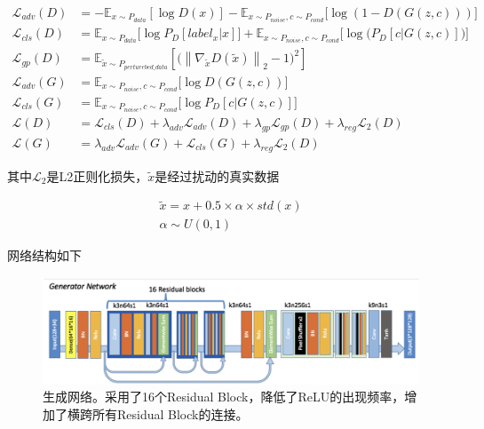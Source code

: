 \documentclass[a4paper,12pt,UTF8]{ctexart}
\newcommand{\norm}[1]{\left\lVert#1\right\rVert}
\newcommand{\kai}{\CJKfamily{zhkai}}	%
\begin{document}
\begin{equation}
\begin{aligned}
  \mathcal{L}_{adv}(D) &= -\mathbb{E}_{x\sim P_{data}}[\log D(x)] - \mathbb{E}_{x\sim P_{noise},c\sim P_{cond}}\big[\log(1-D(G(z,c)))\big] \\
  \mathcal{L}_{cls}(D) &= \mathbb{E}_{x\sim P_{data}}\big[\log P_D[label_x|x]\big] + \mathbb{E}_{x\sim P_{noise},c\sim P_{cond}}\Big[\log\big(P_D[c|G(z,c)]\big)\Big] \\
  \mathcal{L}_{gp}(D) &= \mathbb{E}_{\tilde{x}\sim P_{perturebed\_data}}\left[\big(\norm{\nabla_{\tilde{x}}D(\tilde{x})}_2-1\big)^2\right] \\
  \mathcal{L}_{adv}(G) &= \mathbb{E}_{x\sim P_{noise},c\sim P_{cond}}\big[\log D(G(z,c))\big] \\
  \mathcal{L}_{cls}(G) &= \mathbb{E}_{x\sim P_{noise},c\sim P_{cond}}\big[\log P_D[c|G(z,c)]\big] \\
  \mathcal{L}(D) &= \mathcal{L}_{cls}(D) + \lambda_{adv}\mathcal{L}_{adv}(D) + \lambda_{gp}\mathcal{L}_{gp}(D) + \lambda_{reg} \mathcal{L}_{2}(D) \\
  \mathcal{L}(G) &= \lambda_{adv}\mathcal{L}_{adv}(G) + \mathcal{L}_{cls}(G) + \lambda_{reg} \mathcal{L}_{2}(D)
\end{aligned}
\end{equation}

其中$\mathcal{L}_{2}$是L2正则化损失，$\tilde{x}$是经过扰动的真实数据

\begin{equation}
  \begin{aligned}
    \tilde{x} = x + 0.5 \times \alpha \times std(x) \\
    \alpha \sim U(0, 1)
  \end{aligned}
\end{equation}

网络结构如下

\begin{figure}[H]
  \centering
  \includegraphics[width=1\linewidth]{figs/g_net_moe.png}
  \caption{\kai 生成网络。采用了16个Residual Block，降低了ReLU的出现频率，增加了横跨所有Residual Block的连接。}
  \label{fig:generator}
\end{figure}
\end{document}
